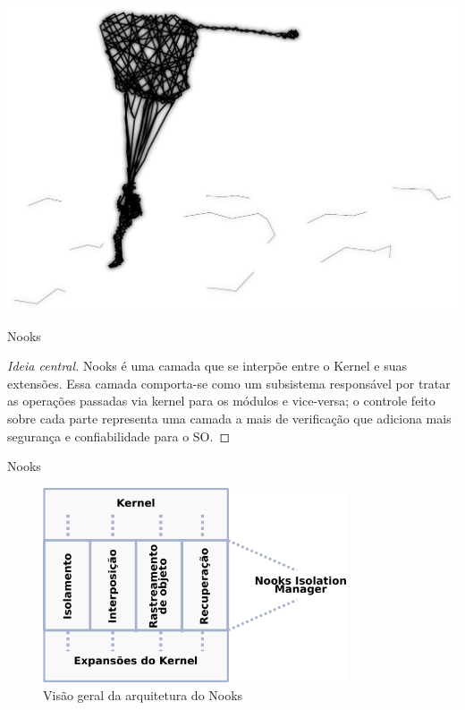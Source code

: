 \documentclass[xcolor={usenames,svgnames,dvipsnames},brazil,english,12pt,aspectratio=149]{beamer}
\begin{document}
\begin{frame}[plain]
  \includegraphics[width=\textwidth]{presentation_cap2_five}
\end{frame}

\begin{frame}{Nooks}

  \begin{proof}[Ideia central]
Nooks é uma camada que se interpõe entre o Kernel e suas extensões. Essa camada
comporta-se como um subsistema responsável por tratar as operações passadas via
kernel para os módulos e vice-versa; o controle feito sobre cada parte
representa uma camada a mais de verificação que adiciona mais segurança e
confiabilidade para o SO.
  \end{proof}

\end{frame}

\begin{frame}{Nooks}
  \begin{figure}[!h]
    \centering
    \includegraphics[width=0.8\textwidth]{nooks_nim}
    \caption[Visão geral da arquitetura do Nooks]{Visão geral da arquitetura do Nooks}
    \label{fig:nooks_nim}
  \end{figure}
\end{frame}
\end{document}

